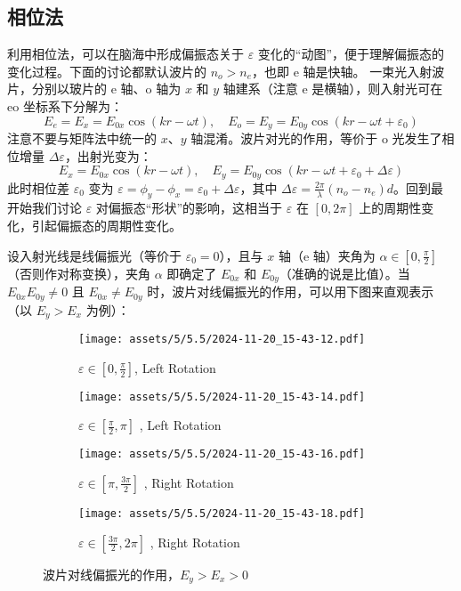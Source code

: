 \documentclass[UTF8]{report}
\theoremstyle{MyLineTheoremStyle} %
\theoremstyle{MyBlockTheoremStyle} %
\theoremstyle{MySubsubsectionStyle} %
\begin{document}
\subsection{相位法}

利用相位法，可以在脑海中形成偏振态关于 $\varepsilon$ 变化的“动图”，便于理解偏振态的变化过程。下面的讨论都默认波片的  $n_o > n_e$，也即 e 轴是快轴。
一束光入射波片，分别以玻片的 e 轴、o 轴为 $x$ 和 $y$ 轴建系（注意 e 是横轴），则入射光可在 eo 坐标系下分解为：
\begin{equation}
E_e = E_x = E_{0x}\cos (kr - \omega t),\quad E_o = E_y = E_{0y}\cos (kr - \omega t + \varepsilon_0)
\end{equation}
注意不要与矩阵法中统一的 $x$、$y$ 轴混淆。波片对光的作用，等价于 o 光发生了相位增量 $\Delta \varepsilon$，出射光变为：
\begin{equation}
    E_x = E_{0x}\cos (kr - \omega t ),\quad E_y = E_{0y}\cos (kr - \omega t + \varepsilon_0 + \Delta \varepsilon)
\end{equation}
此时相位差 $\varepsilon_0$ 变为 $\varepsilon = \phi_y - \phi_x = \varepsilon_0 + \Delta \varepsilon$，其中 $\Delta \varepsilon = \frac{2 \pi }{\lambda} (n_o - n_e)d$。回到最开始我们讨论 $\varepsilon$ 对偏振态“形状”的影响，这相当于 $\varepsilon$ 在 $[0, 2\pi]$ 上的周期性变化，引起偏振态的周期性变化。

设入射光线是线偏振光（等价于 $\varepsilon_0 = 0$），且与 $x$ 轴（e 轴）夹角为 $\alpha \in [0, \frac{\pi}{2}]$（否则作对称变换），夹角 $\alpha$ 即确定了 $E_{0x}$ 和 $E_{0y}$（准确的说是比值）。当 $E_{0x}E_{0y} \ne 0$ 且 $E_{0x} \ne E_{0y}$ 时，波片对线偏振光的作用，可以用下图来直观表示（以 $E_y > E_x$ 为例）：

\begin{figure}[H]\centering
\begin{subfigure}[b]{0.24\columnwidth}\centering
    \texttt{[image: assets/5/5.5/2024-11-20\_15-43-12.pdf]}
    \caption{$\varepsilon \in [0, \frac{\pi}{2}]$, Left Rotation}
\end{subfigure}
\begin{subfigure}[b]{0.24\columnwidth}\centering
    \texttt{[image: assets/5/5.5/2024-11-20\_15-43-14.pdf]}
    \caption{$\varepsilon \in [\frac{\pi}{2}, \pi]$ , Left Rotation}
\end{subfigure}
\begin{subfigure}[b]{0.24\columnwidth}\centering
    \texttt{[image: assets/5/5.5/2024-11-20\_15-43-16.pdf]}
    \caption{$\varepsilon \in [\pi, \frac{3\pi}{2}]$ , Right Rotation}
\end{subfigure}
\begin{subfigure}[b]{0.24\columnwidth}\centering
    \texttt{[image: assets/5/5.5/2024-11-20\_15-43-18.pdf]}
    \caption{$\varepsilon \in [\frac{3\pi}{2}, 2\pi]$ , Right Rotation}
\end{subfigure}
\caption{波片对线偏振光的作用，$E_y > E_x > 0$}
\end{figure}
\end{document}
